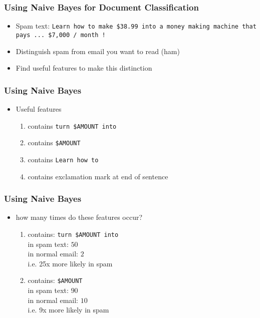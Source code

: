 \begin{frame}
\frametitle{Using Naive Bayes for Document Classification}
\begin{itemize}[<+->]
\item Spam text: {\tt Learn how to make \$38.99 into a money making machine that
  pays ... \$7,000 / month !}
\item Distinguish spam from email you want to read (ham)
\item Find useful features to make this distinction
\end{itemize}
\end{frame}

\begin{frame}
\frametitle{Using Naive Bayes}
\begin{itemize}[<+->]
\item Useful features
  \begin{enumerate}[<+->]
  \item contains {\tt turn \$AMOUNT into }
  \item contains {\tt \$AMOUNT}
  \item contains {\tt Learn how to }
  \item contains exclamation mark at end of sentence
  \end{enumerate}
\end{itemize}
\end{frame}

\begin{frame}
\frametitle{Using Naive Bayes}
\begin{itemize}[<+->]
\item how many times do these features occur?
  \begin{enumerate}[<+->]
  \item contains: {\tt turn \$AMOUNT into }\\
    in spam text: $50$ \\
    in normal email: $2$\\
    i.e. 25x more likely in spam
  \item contains: {\tt \$AMOUNT} \\
    in spam text: $90$ \\
    in normal email: $10$\\
    i.e. 9x more likely in spam
  \end{enumerate}
\end{itemize}
\end{frame}

